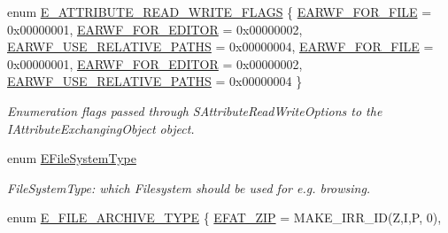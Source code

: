 \begin{DoxyCompactItemize}
\item 
enum \hyperlink{namespaceirr_1_1io_a84923cf86af38e49c6ec5ee36903d782}{E\+\_\+\+A\+T\+T\+R\+I\+B\+U\+T\+E\+\_\+\+R\+E\+A\+D\+\_\+\+W\+R\+I\+T\+E\+\_\+\+F\+L\+A\+GS} \{ \newline
\hyperlink{namespaceirr_1_1io_a84923cf86af38e49c6ec5ee36903d782ae55c31c98611b5b9d2e25a6ff9e56d4f}{E\+A\+R\+W\+F\+\_\+\+F\+O\+R\+\_\+\+F\+I\+LE} = 0x00000001, 
\hyperlink{namespaceirr_1_1io_a84923cf86af38e49c6ec5ee36903d782a0764b32e1fa75ed14931f64d8f68d1a5}{E\+A\+R\+W\+F\+\_\+\+F\+O\+R\+\_\+\+E\+D\+I\+T\+OR} = 0x00000002, 
\hyperlink{namespaceirr_1_1io_a84923cf86af38e49c6ec5ee36903d782ae8a96a03827462eab93b5a0b6214e9ca}{E\+A\+R\+W\+F\+\_\+\+U\+S\+E\+\_\+\+R\+E\+L\+A\+T\+I\+V\+E\+\_\+\+P\+A\+T\+HS} = 0x00000004, 
\hyperlink{namespaceirr_1_1io_a84923cf86af38e49c6ec5ee36903d782ae55c31c98611b5b9d2e25a6ff9e56d4f}{E\+A\+R\+W\+F\+\_\+\+F\+O\+R\+\_\+\+F\+I\+LE} = 0x00000001, 
\newline
\hyperlink{namespaceirr_1_1io_a84923cf86af38e49c6ec5ee36903d782a0764b32e1fa75ed14931f64d8f68d1a5}{E\+A\+R\+W\+F\+\_\+\+F\+O\+R\+\_\+\+E\+D\+I\+T\+OR} = 0x00000002, 
\hyperlink{namespaceirr_1_1io_a84923cf86af38e49c6ec5ee36903d782ae8a96a03827462eab93b5a0b6214e9ca}{E\+A\+R\+W\+F\+\_\+\+U\+S\+E\+\_\+\+R\+E\+L\+A\+T\+I\+V\+E\+\_\+\+P\+A\+T\+HS} = 0x00000004
 \}\begin{DoxyCompactList}\small\item\em Enumeration flags passed through S\+Attribute\+Read\+Write\+Options to the I\+Attribute\+Exchanging\+Object object. \end{DoxyCompactList}
\item 
\mbox{\label{namespaceirr_1_1io_a22364f1caf06442a70f6198025af3fe9}} 
enum \hyperlink{namespaceirr_1_1io_a22364f1caf06442a70f6198025af3fe9}{E\+File\+System\+Type} \begin{DoxyCompactList}\small\item\em File\+System\+Type\+: which Filesystem should be used for e.\+g. browsing. \end{DoxyCompactList}
\item 
enum \hyperlink{namespaceirr_1_1io_adb3e3c445ec8e608ed1f0f93306da14f}{E\+\_\+\+F\+I\+L\+E\+\_\+\+A\+R\+C\+H\+I\+V\+E\+\_\+\+T\+Y\+PE} \{ \newline
\hyperlink{namespaceirr_1_1io_adb3e3c445ec8e608ed1f0f93306da14fa1c63139af703acef490625f7bb6b5525}{E\+F\+A\+T\+\_\+\+Z\+IP} = M\+A\+K\+E\+\_\+\+I\+R\+R\+\_\+\+ID(\textquotesingle{}Z\textquotesingle{},\textquotesingle{}I\textquotesingle{},\textquotesingle{}P\textquotesingle{}, 0), 

\end{DoxyCompactItemize}
